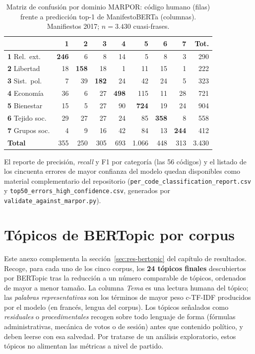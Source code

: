 \begin{table}[H]
\centering
\caption{Matriz de confusión por dominio MARPOR: código humano (filas) frente a
predicción top-1 de ManifestoBERTa (columnas). Manifiestos 2017;
$n = 3.430$ cuasi-frases.}
\label{tab:anexo-confusion-dominio}
\footnotesize
\setlength{\tabcolsep}{3pt}
\begin{tabular}{@{}l r r r r r r r r@{}}
\toprule
 & \textbf{1} & \textbf{2} & \textbf{3} & \textbf{4} & \textbf{5} & \textbf{6} & \textbf{7} & \textbf{Tot.} \\
\midrule
\textbf{1} Rel.\ ext. & \textbf{246} & 6 & 8 & 14 & 5 & 8 & 3 & 290 \\
\textbf{2} Libertad & 18 & \textbf{158} & 18 & 1 & 11 & 15 & 1 & 222 \\
\textbf{3} Sist.\ pol. & 7 & 39 & \textbf{182} & 24 & 42 & 24 & 5 & 323 \\
\textbf{4} Economía & 36 & 6 & 27 & \textbf{498} & 115 & 11 & 28 & 721 \\
\textbf{5} Bienestar & 15 & 5 & 27 & 90 & \textbf{724} & 19 & 24 & 904 \\
\textbf{6} Tejido soc. & 29 & 27 & 27 & 24 & 85 & \textbf{358} & 8 & 558 \\
\textbf{7} Grupos soc. & 4 & 9 & 16 & 42 & 84 & 13 & \textbf{244} & 412 \\
\midrule
\textbf{Total} & 355 & 250 & 305 & 693 & 1.066 & 448 & 313 & 3.430 \\
\bottomrule
\end{tabular}
\end{table}

El reporte de precisión, \emph{recall} y F1 por categoría (las 56 códigos) y el
listado de los cincuenta errores de mayor confianza del modelo quedan
disponibles como material complementario del repositorio
(\texttt{per\_code\_classification\_report.csv} y
\texttt{top50\_errors\_high\_confidence.csv}, generados por
\texttt{validate\_against\_marpor.py}).

\section{Tópicos de BERTopic por corpus}
\label{anexo:bertopic}

Este anexo complementa la sección~\ref{sec:res-bertopic} del capítulo de
resultados. Recoge, para cada uno de los cinco corpus, los \textbf{24 tópicos
finales} descubiertos por BERTopic \cite{grootendorst2022bertopic} tras la
reducción a un número comparable de tópicos, ordenados de mayor a menor tamaño.
La columna \emph{Tema} es una lectura humana del tópico; las
\emph{palabras representativas} son los términos de mayor peso c-TF-IDF
producidos por el modelo (en francés, lengua del corpus). Los tópicos señalados
como \emph{residuales} o \emph{procedimentales} recogen sobre todo lenguaje de
forma (fórmulas administrativas, mecánica de votos o de sesión) antes que
contenido político, y deben leerse con esa salvedad. Por tratarse de un análisis
exploratorio, estos tópicos no alimentan las métricas a nivel de partido.

